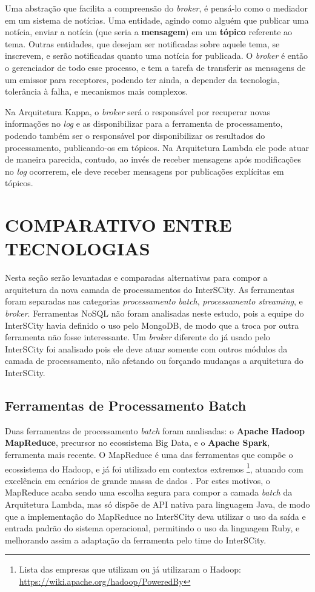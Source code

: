 Uma abstração que facilita a compreensão do \textit{broker}, é pensá-lo como o
mediador em um sistema de notícias. Uma entidade, agindo como alguém que publicar
uma notícia, enviar a notícia (que seria a \textbf{mensagem}) em um
\textbf{tópico} referente ao tema. Outras entidades, que desejam ser notificadas
sobre aquele tema, se inscrevem, e serão notificadas quanto uma notícia for
publicada. O \textit{broker} é então o gerenciador de todo esse processo, e tem
a tarefa de transferir as mensagens de um emissor para receptores, podendo ter
ainda, a depender da tecnologia, tolerância à falha, e mecanismos mais
complexos.

Na Arquitetura Kappa, o \textit{broker} será o responsável por recuperar
novas informações no \textit{log} e as disponibilizar para a ferramenta de
processamento, podendo também ser o responsável por disponibilizar os
resultados do processamento, publicando-os em tópicos. Na Arquitetura Lambda
ele pode atuar de maneira parecida, contudo, ao invés de receber mensagens após
modificações no \textit{log} ocorrerem, ele deve receber mensagens por
publicações explícitas em tópicos.

\section{COMPARATIVO ENTRE TECNOLOGIAS}

Nesta seção serão levantadas e comparadas alternativas para compor a
arquitetura da nova camada de processamentos do InterSCity. As ferramentas
foram separadas nas categorias \textit{processamento batch},
\textit{processamento streaming}, e \textit{broker}. Ferramentas NoSQL não
foram analisadas neste estudo, pois a equipe do InterSCity havia definido o
uso pelo MongoDB, de modo que a troca por outra ferramenta não fosse
interessante. Um \textit{broker} diferente do já usado pelo InterSCity foi
analisado pois ele deve atuar somente com outros módulos da camada de
processamento, não afetando ou forçando mudanças a arquitetura do InterSCity.

\subsection{Ferramentas de Processamento Batch}

Duas ferramentas de processamento \textit{batch} foram analisadas: o
\textbf{Apache Hadoop MapReduce}, precursor no ecossistema Big Data, e o
\textbf{Apache Spark}, ferramenta mais recente. O MapReduce é uma das
ferramentas que compõe o ecossistema do Hadoop, e já foi utilizado em contextos
extremos \cite{zaharia2008}\footnote{Lista das empresas que utilizam ou já
utilizaram o Hadoop: \url{https://wiki.apache.org/hadoop/PoweredBy}}, atuando
com excelência em cenários de grande massa de dados \cite{zaharia2008}. Por
estes motivos, o MapReduce acaba sendo uma escolha segura para compor a camada
\textit{batch} da Arquitetura Lambda, mas só dispõe de API nativa para
linguagem Java, de modo que a implementação do MapReduce no InterSCity deva
utilizar o uso da saída e entrada padrão do sistema operacional, permitindo o
uso da linguagem Ruby, e melhorando assim a adaptação da ferramenta pelo time
do InterSCity.

